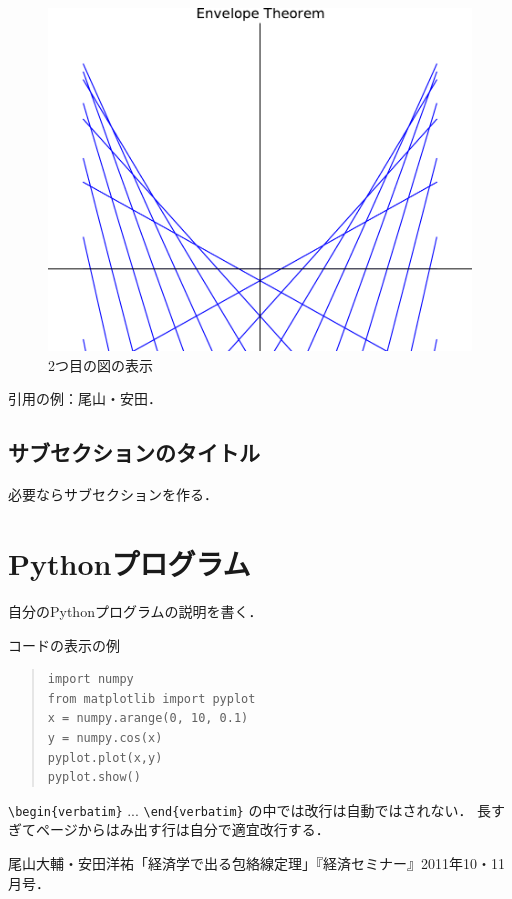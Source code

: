 \documentclass[11pt,a4j,fleqn]{jarticle}
\begin{document}
\begin{figure}
\begin{center}
\includegraphics{envelope1.pdf}
\end{center}
\caption{2つ目の図の表示}
\label{fig:2}
\end{figure}



引用の例：尾山・安田\cite{OyamaYasuda11}．


\subsection{サブセクションのタイトル}

必要ならサブセクションを作る．



\section{Pythonプログラム}

自分のPythonプログラムの説明を書く．

コードの表示の例
\begin{quote}
\begin{verbatim}
import numpy
from matplotlib import pyplot
x = numpy.arange(0, 10, 0.1)
y = numpy.cos(x)
pyplot.plot(x,y)
pyplot.show()
\end{verbatim}
\end{quote}

\verb|\begin{verbatim}| ... \verb|\end{verbatim}| の中では改行は自動ではされない．
長すぎてページからはみ出す行は自分で適宜改行する．



\begin{thebibliography}{0}
尾山大輔・安田洋祐「経済学で出る包絡線定理」『経済セミナー』2011年10・11月号．
\end{thebibliography}
\end{document}

